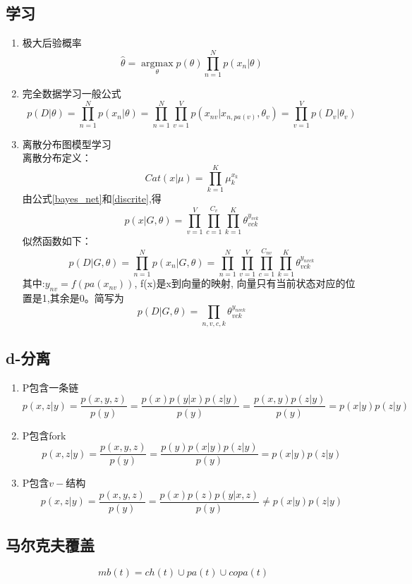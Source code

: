 \subsection{学习}
\begin{enumerate}
\item 极大后验概率
\begin{equation}
\hat{\theta} =
\underset{\theta}{\operatorname{argmax}}
p(\theta)\prod_{n=1}^Np(x_n|\theta)
\end{equation}
\item 完全数据学习一般公式
\begin{equation}
p(D|\theta) = \prod_{n=1}^Np(x_n|\theta)
= \prod_{n=1}^N\prod_{v=1}^Vp(x_{nv}|x_{n, pa(v)}, \theta_v)
= \prod_{v=1}^Vp(D_v|\theta_v)
\end{equation}

\item 离散分布图模型学习\\
离散分布定义：
\begin{equation}
Cat(x|\mu) = \prod_{k=1}^K\mu_k^{x_k}
\label{discrite}
\end{equation}
由公式\ref{bayes_net}和\ref{discrite},得
\begin{equation}
p(x|G,\theta) = \prod_{v=1}^V\prod_{c=1}^{C_v}\prod_{k=1}^K
\theta_{vck}^{y_{vck}}
\end{equation}
似然函数如下：
\begin{equation}
p(D|G,\theta) = \prod_{n=1}^N p(x_n|G,\theta)
=\prod_{n=1}^N\prod_{v=1}^V\prod_{c=1}^{C_{nv}}\prod_{k=1}^K
\theta_{vck}^{y_{nvck}}
\end{equation}
其中:$y_{nv} = f(pa(x_{nv}))$, f(x)是x到向量的映射,
向量只有当前状态对应的位置是1,其余是0。简写为
\begin{equation}
p(D|G,\theta) = \prod_{n, v, c, k}
\theta_{vck}^{y_{nvck}}
\end{equation}
\end{enumerate}
\subsection{d-分离}
\begin{enumerate}
\item P包含一条链
\begin{equation}
p(x,z|y) = \frac{p(x,y,z)}{p(y)}
= \frac{p(x)p(y|x)p(z|y)}{p(y)}
= \frac{p(x,y)p(z|y)}{p(y)} = p(x|y)p(z|y)
\end{equation}

\item P包含fork
\begin{equation}
p(x,z|y) = \frac{p(x,y,z)}{p(y)}
= \frac{p(y)p(x|y)p(z|y)}{p(y)}
= p(x|y)p(z|y)
\end{equation}
\item P包含$v-$结构
\begin{equation}
p(x,z|y) = \frac{p(x,y,z)}{p(y)}
= \frac{p(x)p(z)p(y|x,z)}{p(y)}
\neq p(x|y)p(z|y)
\end{equation}
\end{enumerate}
\subsection{马尔克夫覆盖}
\begin{equation}
mb(t) = ch(t)\cup pa(t)\cup copa(t)
\end{equation}

